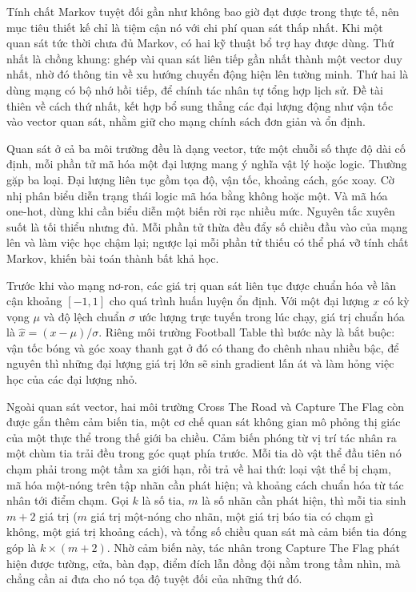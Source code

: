 \indent Tính chất Markov tuyệt đối gần như không bao giờ đạt được trong thực tế, nên mục
tiêu thiết kế chỉ là tiệm cận nó với chi phí quan sát thấp nhất. Khi một quan sát tức thời
chưa đủ Markov, có hai kỹ thuật bổ trợ hay được dùng. Thứ nhất là chồng khung: ghép vài
quan sát liên tiếp gần nhất thành một vector duy nhất, nhờ đó thông tin về xu hướng chuyển
động hiện lên tường minh. Thứ hai
là dùng mạng có bộ nhớ hồi tiếp, để chính tác nhân tự tổng hợp lịch sử. Đề tài thiên về
cách thứ nhất, kết hợp bổ sung thẳng các đại lượng động như vận tốc vào vector quan sát,
nhằm giữ cho mạng chính sách đơn giản và ổn định.

\indent Quan sát ở cả ba môi trường đều là dạng vector, tức một chuỗi số thực độ dài cố
định, mỗi phần tử mã hóa một đại lượng mang ý nghĩa vật lý hoặc logic. Thường gặp ba loại.
Đại lượng liên tục gồm tọa độ, vận tốc, khoảng cách, góc xoay. Cờ nhị phân biểu diễn trạng
thái logic mã hóa bằng không hoặc một. Và mã hóa
one-hot, dùng khi cần biểu diễn một biến rời rạc nhiều mức. Nguyên tắc xuyên suốt là tối
thiểu nhưng đủ. Mỗi phần tử thừa đều đẩy số chiều đầu vào của mạng lên và làm việc học
chậm lại; ngược lại mỗi phần tử thiếu có thể phá vỡ tính chất Markov, khiến bài toán thành
bất khả học.

\indent Trước khi vào mạng nơ-ron, các giá trị quan sát liên tục được chuẩn hóa về lân cận
khoảng $[-1, 1]$ cho quá trình huấn luyện ổn định. Với một đại lượng $x$ có kỳ vọng $\mu$
và độ lệch chuẩn $\sigma$ ước lượng trực tuyến trong lúc chạy, giá trị chuẩn hóa là
$\hat{x} = (x - \mu)/\sigma$. Riêng môi trường Football Table thì bước này là bắt buộc:
vận tốc bóng và góc xoay thanh gạt ở đó có thang đo chênh nhau nhiều bậc, để nguyên thì
những đại lượng giá trị lớn sẽ sinh gradient lấn át và làm hỏng việc học của các đại lượng
nhỏ.

\indent Ngoài quan sát vector, hai môi trường Cross The Road và Capture The Flag còn được
gắn thêm cảm biến tia, một cơ chế quan sát không gian mô phỏng thị giác của một thực thể
trong thế giới ba chiều. Cảm biến phóng từ vị trí tác nhân ra một chùm tia trải đều trong
góc quạt phía trước. Mỗi tia dò vật thể đầu tiên nó chạm phải trong một tầm xa giới hạn,
rồi trả về hai thứ: loại vật thể bị chạm, mã hóa một-nóng trên tập nhãn cần phát hiện; và
khoảng cách chuẩn hóa từ tác nhân tới điểm chạm. Gọi $k$ là số tia, $m$ là số nhãn cần
phát hiện, thì mỗi tia sinh $m + 2$ giá trị ($m$ giá trị một-nóng cho nhãn, một giá trị báo
tia có chạm gì không, một giá trị khoảng cách), và tổng số chiều quan sát mà cảm biến
tia đóng góp là $k \times (m + 2)$. Nhờ cảm biến này, tác nhân trong Capture The Flag phát
hiện được tường, cửa, bàn đạp, điểm đích lẫn đồng đội nằm trong tầm nhìn, mà chẳng cần ai
đưa cho nó tọa độ tuyệt đối của những thứ đó.

